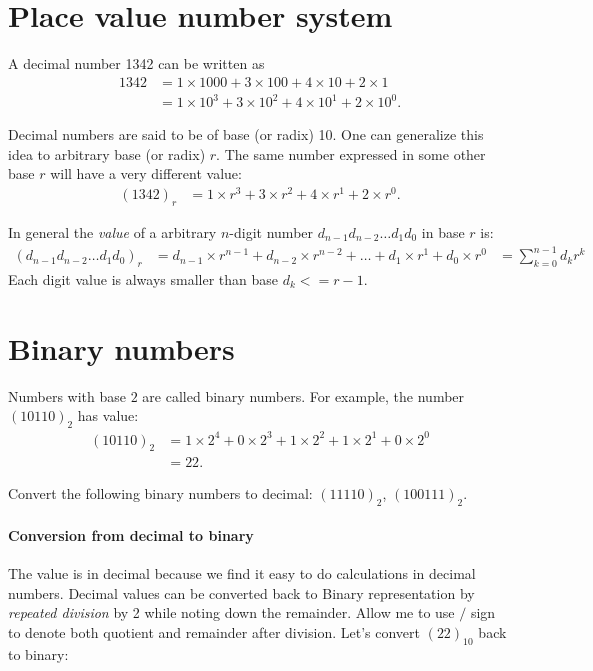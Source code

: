 
\section{Place value number system}

A decimal number 1342 can be written as
\begin{align*}
  1342&=1\times1000 + 3\times100 + 4\times10 + 2\times1
        \\
      &=1\times10^3 + 3\times10^2+4\times10^1 + 2\times10^0.
\end{align*}

Decimal numbers are said to be of base (or radix) 10. One can generalize this
idea to arbitrary base (or radix) $r$. The same number expressed in some other
base $r$ will have a very different value:
\begin{align*}
  (1342)_r &=1\times r^3 + 3\times r^2+4\times r^1 + 2\times r^0.
\end{align*}

In general the \emph{value} of a arbitrary $n$-digit number $d_{n-1}d_{n-2}
\dots d_1 d_0$ in base $r$ is:
\begin{align*}
  (d_{n-1}d_{n-2} \dots d_1 d_0)_r &=d_{n-1} \times r^{n-1} + d_{n-2}\times r^{n-2}+ \dots + d_1\times r^1 + d_0\times r^0 &= \sum_{k=0}^{n-1} d_k r^k
\end{align*}
Each digit value is always smaller than base $d_k <= r-1$.

\section{Binary numbers}

Numbers with base $2$ are called binary numbers. For example, the number
$(10110)_2$ has value:
\begin{align*}
  (10110)_2 &= 1 \times 2^4+ 0 \times 2^3 + 1\times 2^2 + 1 \times 2^1+ 0\times 2^0
              \\
            &= 22.
\end{align*}

\begin{prob}
  Convert the following binary numbers to decimal: $(11110)_2$, $(100111)_2$.
\end{prob}
\vspace{10em}

\paragraph{Conversion from decimal to binary}
The value is in decimal because we find it easy to do calculations in decimal
numbers. Decimal values can be converted back to Binary representation by
\emph{repeated division} by 2 while noting down the remainder. Allow me
to use $/$ sign to denote both quotient and remainder after division. Let's convert $(22)_{10}$
back to binary: 

